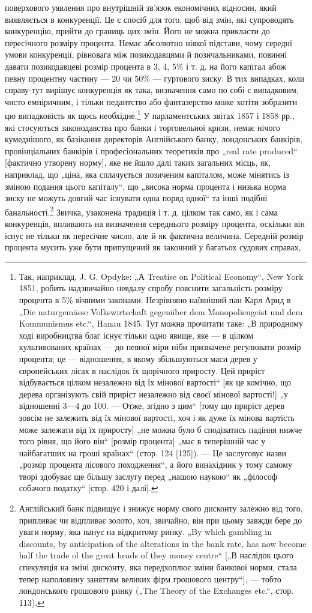 поверхового уявлення про внутрішній зв’язок економічних відносин,
який виявляється в конкуренції. Це є спосіб для того, щоб від
змін, які супроводять конкуренцію, прийти до границь цих змін.
Його не можна прикласти до пересічного розміру процента.
Немає абсолютно ніякої підстави, чому середні умови конкуренції,
рівновага між позикодавцями й позичальниками, повинні давати
позикодавцеві розмір процента в 3, 4, 5\% і т. д. на його капітал
абож певну процентну частину — 20 чи 50\% — гуртового
зиску. В тих випадках, коли справу-тут вирішує конкуренція як
така, визначення само по собі є випадковим, чисто емпіричним,
і тільки педантство або фантазерство може хотіти зобразити
цю випадковість як щось необхідне.\footnote{
Так, наприклад, J. G. Opdyke: „А Treatise on Political Economy“, New
York 1851, робить надзвичайно невдалу спробу пояснити загальність розміру
процента в 5\% вічними законами. Незрівняно наївніший пан Карл Арнд в „Die
naturgemässe Volkswirtschaft gegenüber dem Monopoliengeist und dem Kommunismus
etc.“, Hanau 1845. Тут можна прочитати таке: „В природному ході виробництва
благ існує тільки одно явище, яке — в цілком культивованих країнах — до
певної міри ніби призначене регулювати розмір процента; це — відношення,
в якому збільшуються маси дерев у європейських лісах в наслідок їх щорічного
приросту. Цей приріст відбувається цілком незалежно від їх мінової вартості“
[як це комічно, що дерева організують свій приріст незалежно від своєї мінової
вартості!] „у відношенні 3—4 до 100. — Отже, згідно з цим“ [тому що приріст
дерев зовсім не залежить від їх мінової вартості, хоч і як дуже їх мінова вартість
може залежати від їх приросту] „не можна було б сподіватись падіння
нижче того рівня, що його він“ [розмір процента] „має в теперішній час у
найбагатших на гроші країнах“ (стор. 124 [125]). — Це заслуговує назви „розмір
процента лісового походження“, а його винахідник у тому самому творі здобуває
ще більшу заслугу перед „нашою наукою“ як „філософ собачого податку“
[стор. 420 і далі].
} У парламентських звітах
1857 і 1858 рр., які стосуються законодавства про банки і торговельної
кризи, немає нічого кумеднішого, як базікання директорів
Англійського банку, лондонських банкірів, провінціальних
банкірів і професіональних теоретиків про „real rate produced“
[фактично утворену норму], яке не йшло далі таких загальних
місць, як, наприклад, що „ціна, яка сплачується позиченим
капіталом, може мінятись із зміною подання цього капіталу“,
що „висока норма процента і низька норма зиску не можуть
довгий час існувати одна поряд одної“ та інші подібні банальності.\footnote{
Англійський банк підвищує і знижує норму свого дисконту залежно від
того, припливає чи відпливає золото, хоч, звичайно, він при цьому завжди бере
до уваги норму, яка панує на відкритому ринку. „By which gambling in discounts,
by anticipation of the alterations in the bank rate, has now become half the trade
ol the great heads of they money centre“ [„В наслідок цього спекуляція на зміні
дисконту, яка передхоплює зміни банкової норми, стала тепер наполовину
заняттям великих фірм грошового центру“], — тобто лондонського грошового
ринку („The Theory of the Exchanges etc.“, стор. 113).
}
Звичка, узаконена традиція і т. д. цілком так само, як
і сама конкуренція, впливають на визначення середнього розміру
процента, оскільки він існує не тільки як пересічне число,
але й як фактична величина. Середній розмір процента мусить
уже бути припущений як законний у багатьох судових справах,